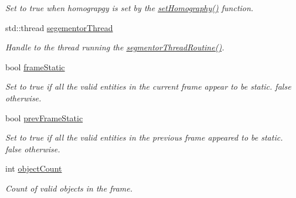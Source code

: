 \begin{DoxyCompactItemize}
\begin{DoxyCompactList}\small\item\em Set to true when homograpgy is set by the \hyperlink{classpersonal_robotics_1_1_object_segmentor_a44bbf97572b59f392b73fff1fafccc24}{set\+Homography()} function. \end{DoxyCompactList}\item 
\hypertarget{classpersonal_robotics_1_1_object_segmentor_afa78651f85b2dd6fe132d4c850ab2cef}{}std\+::thread \hyperlink{classpersonal_robotics_1_1_object_segmentor_afa78651f85b2dd6fe132d4c850ab2cef}{segementor\+Thread}\label{classpersonal_robotics_1_1_object_segmentor_afa78651f85b2dd6fe132d4c850ab2cef}

\begin{DoxyCompactList}\small\item\em Handle to the thread running the \hyperlink{classpersonal_robotics_1_1_object_segmentor_a54dffdc44e4b61ee329c7524f5c04ed1}{segmentor\+Thread\+Routine()}. \end{DoxyCompactList}\item 
\hypertarget{classpersonal_robotics_1_1_object_segmentor_ae2b23b9198ab28786dbac7801aa1d0cb}{}bool \hyperlink{classpersonal_robotics_1_1_object_segmentor_ae2b23b9198ab28786dbac7801aa1d0cb}{frame\+Static}\label{classpersonal_robotics_1_1_object_segmentor_ae2b23b9198ab28786dbac7801aa1d0cb}

\begin{DoxyCompactList}\small\item\em Set to true if all the valid entities in the current frame appear to be static. false otherwise. \end{DoxyCompactList}\item 
\hypertarget{classpersonal_robotics_1_1_object_segmentor_a09017399b3cca7c2715ea406bec511f5}{}bool \hyperlink{classpersonal_robotics_1_1_object_segmentor_a09017399b3cca7c2715ea406bec511f5}{prev\+Frame\+Static}\label{classpersonal_robotics_1_1_object_segmentor_a09017399b3cca7c2715ea406bec511f5}

\begin{DoxyCompactList}\small\item\em Set to true if all the valid entities in the previous frame appeared to be static. false otherwise. \end{DoxyCompactList}\item 
\hypertarget{classpersonal_robotics_1_1_object_segmentor_acdde55937977d3c65574ef6dbc21a47f}{}int \hyperlink{classpersonal_robotics_1_1_object_segmentor_acdde55937977d3c65574ef6dbc21a47f}{object\+Count}\label{classpersonal_robotics_1_1_object_segmentor_acdde55937977d3c65574ef6dbc21a47f}

\begin{DoxyCompactList}\small\item\em Count of valid objects in the frame. \end{DoxyCompactList}\end{DoxyCompactItemize}


